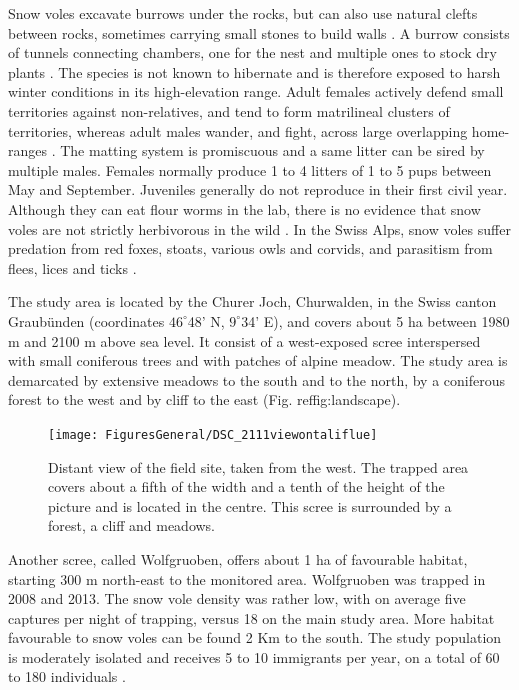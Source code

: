 Snow voles excavate burrows under the rocks, but can also use natural clefts between rocks, sometimes carrying small stones to build walls \parencite{Niederer2008}. A burrow consists of tunnels connecting chambers, one for the nest and multiple ones to stock dry plants \parencite{Janeau1997}. The species is not known to hibernate and is therefore exposed to harsh winter conditions in its high-elevation range. 
Adult females actively defend small territories against non-relatives, and tend to form matrilineal clusters of territories, whereas adult males wander, and fight, across large overlapping home-ranges \parencite{Luque-larena2004, Garcia-Navas2016}. The matting system is promiscuous and a same litter can be sired by multiple males. Females normally produce 1 to 4 litters of 1 to 5 pups between May and September. Juveniles generally do not reproduce in their first civil year. 
Although they can eat flour worms in the lab, there is no evidence that snow voles are not strictly herbivorous in the wild \parencite{Janeau1997}. In the Swiss Alps, snow voles suffer predation from red foxes, stoats, various owls and corvids, and parasitism from flees, lices and ticks \parencite{Janeau1997, Martinoli2001}.

The study area is located by the Churer Joch, Churwalden, in the Swiss canton Graub\"unden (coordinates $46^{\circ}$48' N, $9^{\circ}$34' E), and covers about 5 ha between 1980 m and 2100 m above sea level. It consist of a west-exposed scree interspersed with small coniferous trees and with patches of alpine meadow. The study area is demarcated by extensive meadows to the south and to the north, by a coniferous forest to the west and by cliff to the east (Fig. ref{fig:landscape}). 
\begin{figure}[ht]
	\texttt{[image: FiguresGeneral/DSC\_2111viewontaliflue]}
	\caption{Distant view of the field site, taken from the west. The trapped area covers about a fifth of the width and a tenth of the height of the picture and is located in the centre. This scree is surrounded by a forest, a cliff and meadows.}
	\label{fig:landscape}
\end{figure}

Another scree, called Wolfgruoben, offers about 1 ha of favourable habitat, starting 300 m north-east to the monitored area. Wolfgruoben was trapped in 2008 and 2013. The snow vole density was rather low, with on average five captures per night of trapping, versus 18 on the main study area. More habitat favourable to snow voles can be found 2 Km to the south. The study population is moderately isolated and receives 5 to 10 immigrants per year, on a total of 60 to 180 individuals \parencite{Garcia-Navas2016}. 

